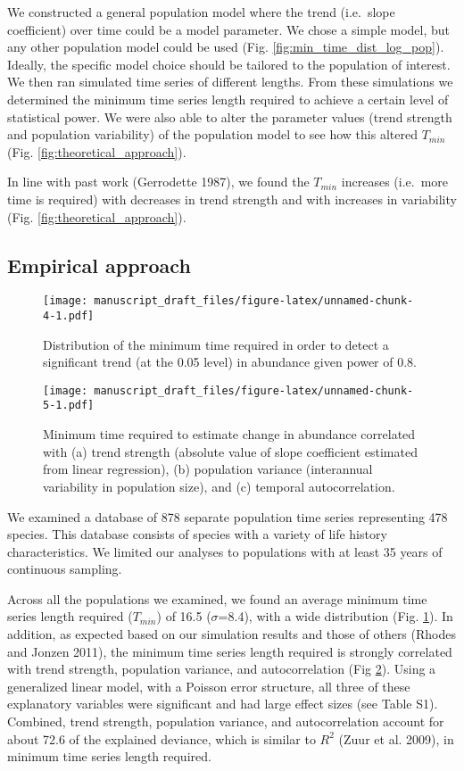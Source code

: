 \documentclass[12pt,]{article}
\begin{document}
We constructed a general population model where the trend (i.e.~slope
coefficient) over time could be a model parameter. We chose a simple
model, but any other population model could be used (Fig.
\ref{fig:min_time_dist_log_pop}). Ideally, the specific model choice
should be tailored to the population of interest. We then ran simulated
time series of different lengths. From these simulations we determined
the minimum time series length required to achieve a certain level of
statistical power. We were also able to alter the parameter values
(trend strength and population variability) of the population model to
see how this altered \(T_{min}\) (Fig. \ref{fig:theoretical_approach}).

In line with past work (Gerrodette 1987), we found the \(T_{min}\)
increases (i.e.~more time is required) with decreases in trend strength
and with increases in variability (Fig. \ref{fig:theoretical_approach}).

\subsection{Empirical approach}\label{empirical-approach-1}

\begin{figure}[htbp]
\centering
\texttt{[image: manuscript\_draft\_files/figure-latex/unnamed-chunk-4-1.pdf]}
\caption{Distribution of the minimum time required in order to detect a
significant trend (at the 0.05 level) in abundance given power of
0.8.\label{fig:min_time_dist}}
\end{figure}

\begin{figure}[htbp]
\centering
\texttt{[image: manuscript\_draft\_files/figure-latex/unnamed-chunk-5-1.pdf]}
\caption{Minimum time required to estimate change in abundance
correlated with (a) trend strength (absolute value of slope coefficient
estimated from linear regression), (b) population variance (interannual
variability in population size), and (c) temporal
autocorrelation.\label{fig:correlates}}
\end{figure}

We examined a database of 878 separate population time series
representing 478 species. This database consists of species with a
variety of life history characteristics. We limited our analyses to
populations with at least 35 years of continuous sampling.

Across all the populations we examined, we found an average minimum time
series length required (\(T_{min}\)) of 16.5 (\(\sigma\)=8.4), with a
wide distribution (Fig. \ref{fig:min_time_dist}). In addition, as
expected based on our simulation results and those of others (Rhodes and
Jonzen 2011), the minimum time series length required is strongly
correlated with trend strength, population variance, and autocorrelation
(Fig \ref{fig:correlates}). Using a generalized linear model, with a
Poisson error structure, all three of these explanatory variables were
significant and had large effect sizes (see Table S1). Combined, trend
strength, population variance, and autocorrelation account for about
72.6 of the explained deviance, which is similar to \(R^2\) (Zuur et al.
2009), in minimum time series length required.
\end{document}
